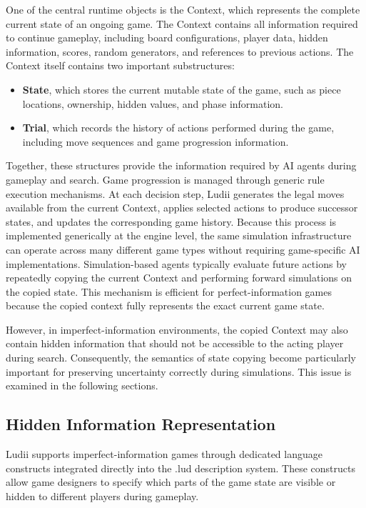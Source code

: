 One of the central runtime objects is the Context, which represents the complete current state of an ongoing game. The Context contains all information required to continue gameplay, including board configurations, player data, hidden information, scores, random generators, and references to previous actions. The Context itself contains two important substructures:
\begin{itemize}
    \item \textbf{State}, which stores the current mutable state of the game, such as piece locations, ownership, hidden values, and phase information.

    \item \textbf{Trial}, which records the history of actions performed during the game, including move sequences and game progression information.
\end{itemize}
Together, these structures provide the information required by AI agents during gameplay and search. Game progression is managed through generic rule execution mechanisms. At each decision step, Ludii generates the legal moves available from the current Context, applies selected actions to produce successor states, and updates the corresponding game history. Because this process is implemented generically at the engine level, the same simulation infrastructure can operate across many different game types without requiring game-specific AI implementations. Simulation-based agents typically evaluate future actions by repeatedly copying the current Context and performing forward simulations on the copied state. This mechanism is efficient for perfect-information games because the copied context fully represents the exact current game state.

However, in imperfect-information environments, the copied Context may also contain hidden information that should not be accessible to the acting player during search. Consequently, the semantics of state copying become particularly important for preserving uncertainty correctly during simulations. This issue is examined in the following sections.

\subsection{Hidden Information Representation}
Ludii supports imperfect-information games through dedicated language constructs integrated directly into the .lud description system. These constructs allow game designers to specify which parts of the game state are visible or hidden to different players during gameplay.

